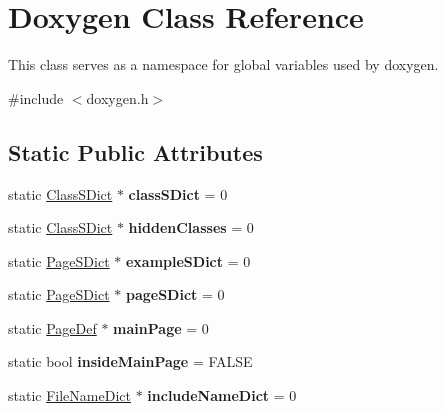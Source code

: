 \hypertarget{class_doxygen}{}\section{Doxygen Class Reference}
\label{class_doxygen}


This class serves as a namespace for global variables used by doxygen.  




{\ttfamily \#include $<$doxygen.\+h$>$}

\subsection*{Static Public Attributes}
\begin{DoxyCompactItemize}
\item 
\mbox{\label{class_doxygen_a707a44cf6887311937ada7bb7e4ffcc7}} 
static \mbox{\hyperlink{class_class_s_dict}{Class\+S\+Dict}} $\ast$ {\bfseries class\+S\+Dict} = 0
\item 
\mbox{\label{class_doxygen_a95780a9acf96cd8425ab0553fda0a67d}} 
static \mbox{\hyperlink{class_class_s_dict}{Class\+S\+Dict}} $\ast$ {\bfseries hidden\+Classes} = 0
\item 
\mbox{\label{class_doxygen_a3db39033e7dfb6816406c9c01679150a}} 
static \mbox{\hyperlink{class_page_s_dict}{Page\+S\+Dict}} $\ast$ {\bfseries example\+S\+Dict} = 0
\item 
\mbox{\label{class_doxygen_a0a33d9d9e74d16418a37d67faf0315a3}} 
static \mbox{\hyperlink{class_page_s_dict}{Page\+S\+Dict}} $\ast$ {\bfseries page\+S\+Dict} = 0
\item 
\mbox{\label{class_doxygen_ab02c8d98cdc6b4bf1d81a0b0cf4b4ecb}} 
static \mbox{\hyperlink{class_page_def}{Page\+Def}} $\ast$ {\bfseries main\+Page} = 0
\item 
\mbox{\label{class_doxygen_a419b27a523ea0261e58103f998c68a12}} 
static bool {\bfseries inside\+Main\+Page} = F\+A\+L\+SE
\item 
\mbox{\label{class_doxygen_a84c9e6834fd53dff0fc4147f14a40a07}} 
static \mbox{\hyperlink{class_file_name_dict}{File\+Name\+Dict}} $\ast$ {\bfseries include\+Name\+Dict} = 0

\end{DoxyCompactItemize}
